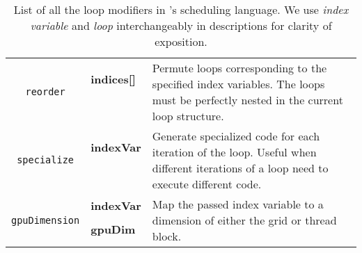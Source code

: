 \begin{table}[htb]
{\begin{tabularx}{\linewidth}{c | l | l}
   \midrule
   \multirow{4}{*}{\texttt{reorder}} & \textbf{indices[]}  & \multirow{4}{*}{\parbox{0.55\linewidth}{Permute loops corresponding to the specified index variables.
   The loops must be perfectly nested in the current loop structure.}} \\
                                               &   & \\
                                               &   &  \\
                                               &   &  \\
   \midrule
   \multirow{4}{*}{\texttt{specialize}} & \textbf{indexVar}  & \multirow{4}{*}{\parbox{0.55\linewidth}{Generate specialized code for each iteration of the loop. 
   Useful when different iterations of a loop need to execute different code.}} \\
                                               &   & \\
                                               &   &  \\
                                               &   &  \\
   \midrule
   \multirow{3}{*}{\texttt{gpuDimension}} & \textbf{indexVar}  & \multirow{3}{*}{\parbox{0.55\linewidth}{Map the passed index variable to a dimension of either the grid
   or thread block.}} \\
                                               & \textbf{gpuDim}  & \\
                                               &   &  \\

  \bottomrule
  \end{tabularx}
  }
  \vskip 5pt
  \caption{\label{Tab:LoopModifiers} List of all the loop modifiers in \Treebeard{}'s scheduling language. We use \emph{index variable}
  and \emph{loop} interchangeably in descriptions for clarity of exposition.}
\end{table}



